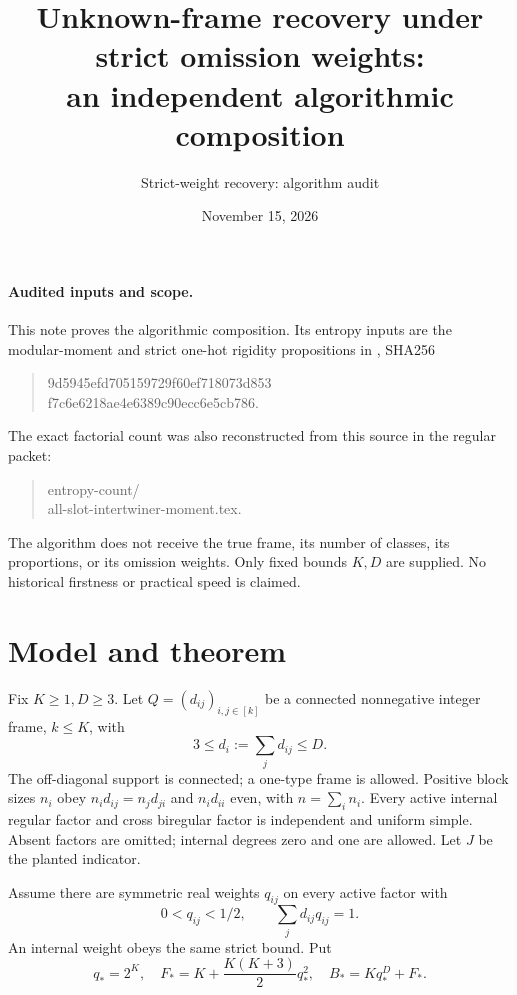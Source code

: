 \documentclass[11pt]{article}
\title{Unknown-frame recovery under strict omission weights:\\
an independent algorithmic composition}
\author{Strict-weight recovery: algorithm audit}
\date{November 15, 2026}
\begin{document}
\maketitle

\paragraph{Audited inputs and scope.}
This note proves the algorithmic composition. Its entropy inputs are
the modular-moment and strict one-hot rigidity propositions in
,
SHA256
\begin{quote}\small\ttfamily
9d5945efd705159729f60ef718073d853\\
f7c6e6218ae4e6389c90ecc6e5cb786.
\end{quote}
The exact factorial count was also reconstructed from this source in
the regular packet:
\begin{quote}\small\ttfamily
entropy-count/\\all-slot-intertwiner-moment.tex.
\end{quote}
The algorithm does not receive the true frame, its number of classes,
its proportions, or its omission weights. Only fixed bounds $K,D$ are
supplied. No historical firstness or practical speed is claimed.

\section{Model and theorem}
Fix $K\ge1,D\ge3$. Let $Q=(d_{ij})_{i,j\in[k]}$ be a connected
nonnegative integer frame, $k\le K$, with
\[
 3\le d_i:=\sum_jd_{ij}\le D.
\]
The off-diagonal support is connected; a one-type frame is allowed.
Positive block sizes $n_i$ obey
$n_id_{ij}=n_jd_{ji}$ and $n_id_{ii}$ even, with $n=\sum_i n_i$.
Every active internal regular factor and cross biregular factor is
independent and uniform simple. Absent factors are omitted; internal
degrees zero and one are allowed. Let $J$ be the planted indicator.

Assume there are symmetric real weights $q_{ij}$ on every active factor
with
\[
 0<q_{ij}<1/2,\qquad \sum_jd_{ij}q_{ij}=1.
\]
An internal weight obeys the same strict bound. Put
\[
 q_*=2^K,\quad F_*=K+\frac{K(K+3)}2q_*^2,
 \quad B_*=Kq_*^D+F_*.
\]
\end{document}
